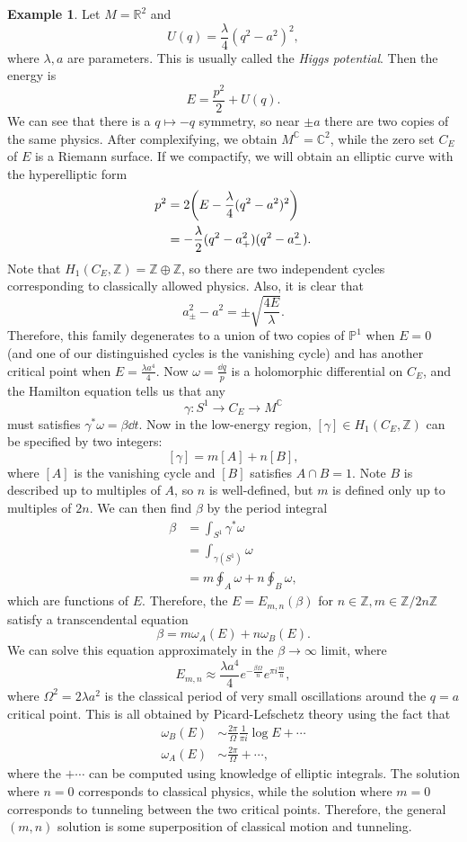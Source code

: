 \documentclass[leqno, openany]{memoir}
\theoremstyle{definition}
\newtheorem{exm}[thm]{Example}
\theoremstyle{remark}
\theoremstyle{plain}
\theoremstyle{definition}
\theoremstyle{remark}
\newcommand{\R}{\mathbb{R}}
\newcommand{\C}{\mathbb{C}}
\newcommand{\Z}{\mathbb{Z}}
\renewcommand{\P}{\mathbb{P}}
\begin{document}
\begin{exm}
  Let $M = \R^2$ and
  \[ U(q) = \frac{\lambda}{4} (q^2-a^2)^2, \]
  where $\lambda, a$ are parameters. This is usually called the \textit{Higgs potential}. Then the energy is
  \[ E = \frac{p^2}{2} + U(q). \]
  We can see that there is a $q \mapsto -q$ symmetry, so near $\pm a$ there are two copies of the same physics. After complexifying, we obtain $M^{\C} = \C^2$, while the zero set $C_E$ of $E$ is a Riemann surface. If we compactify, we will obtain an elliptic curve with the hyperelliptic form
  \begin{align*}
    p^2 &= 2\qty(E-\frac{\lambda}{4}(q^2-a^2)^2) \\
    &= -\frac{\lambda}{2} (q^2-a_+^2)(q^2-a_-^2).
  \end{align*}
  Note that $H_1(C_E, \Z) = \Z \oplus \Z$, so there are two independent cycles corresponding to classically allowed physics. Also, it is clear that
  \[ a_{\pm}^2 - a^2 = \pm \sqrt{\frac{4E}{\lambda}}. \]
  Therefore, this family degenerates to a union of two copies of $\P^1$ when $E=0$ (and one of our distinguished cycles is the vanishing cycle) and has another critical point when $E = \frac{\lambda a^4}{4}$. Now $\omega = \frac{\dd{q}}{p}$ is a holomorphic differential on $C_E$, and the Hamilton equation tells us that any
  \[ \gamma \colon S^1 \to C_E \to M^{\C} \]
  must satisfies $\gamma^* \omega = \beta \dd{t}$. Now in the low-energy region, $[\gamma] \in H_1(C_E, \Z)$ can be specified by two integers:
  \[ [\gamma] = m[A] + n[B], \]
  where $[A]$ is the vanishing cycle and $[B]$ satisfies $A \cap B = 1$. Note $B$ is described up to multiples of $A$, so $n$ is well-defined, but $m$ is defined only up to multiples of $2n$. We can then find $\beta$ by the period integral
  \begin{align*}
    \beta &= \int_{S^1} \gamma^* \omega \\
          &= \int_{\gamma(S^1)} \omega \\
          &= m \oint_A \omega + n\oint_B \omega,
  \end{align*}
  which are functions of $E$. Therefore, the $E = E_{m,n}(\beta)$ for $n\in \Z, m \in \Z/2n\Z$ satisfy a transcendental equation
  \[ \beta = m\omega_A(E) + n\omega_B(E). \]
  We can solve this equation approximately in the $\beta \to \infty$ limit, where
  \[ E_{m,n} \approx \frac{\lambda a^4}{4} e^{-\frac{\beta \Omega}{n}}e^{\pi i \frac{m}{n}}, \]
  where $\Omega^2 = 2\lambda a^2$ is the classical period of very small oscillations around the $q=a$ critical point. This is all obtained by Picard-Lefschetz theory using the fact that
  \begin{align*}
    \omega_B(E) &\sim \frac{2\pi}{\Omega}\frac{1}{\pi i} \log E + \cdots \\
    \omega_A(E) &\sim \frac{2\pi}{\Omega} + \cdots,
  \end{align*}
  where the $+\cdots$ can be computed using knowledge of elliptic integrals. The solution where $n=0$ corresponds to classical physics, while the solution where $m=0$ corresponds to tunneling between the two critical points. Therefore, the general $(m,n)$ solution is some superposition of classical motion and tunneling.
\end{exm}
\end{document}
